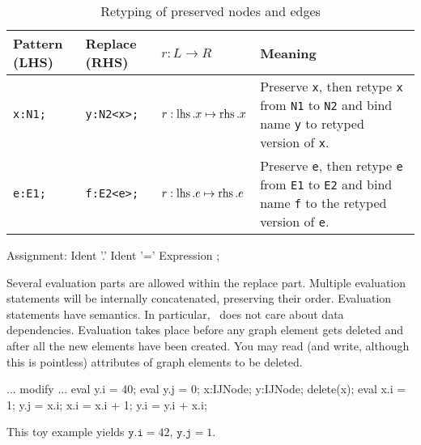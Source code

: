 \begin{table}[htbp]
\centering
\begin{tabularx}{\linewidth}{lllX}
  \textbf{Pattern (LHS)} & \textbf{Replace (RHS)} & \textbf{$r: L \longrightarrow R$} & \textbf{Meaning} \\ \hline 
  \texttt{x:N1;} & \texttt{y:N2<x>;}          & $r:\operatorname{lhs}.x \mapsto \operatorname{rhs}.x$ & Preserve \texttt{x}, then retype \texttt{x} from \texttt{N1} to \texttt{N2} and bind name \texttt{y} to retyped version of \texttt{x}.\\
  \texttt{e:E1;} & \texttt{f:E2<e>;}          & $r:\operatorname{lhs}.e \mapsto \operatorname{rhs}.e$ & Preserve \texttt{e}, then retype \texttt{e} from \texttt{E1} to \texttt{E2} and bind name \texttt{f} to the retyped version of \texttt{e}.\\
\end{tabularx}
\caption{Retyping of preserved nodes and edges}
\label{rule:retyping_graphlets}
\end{table}

\begin{rail}    
   Assignment: Ident '.' Ident '=' Expression ;
\end{rail}
Several evaluation parts are allowed within the replace part. Multiple evaluation statements will be internally concatenated, preserving their order. Evaluation statements have  semantics. In particular, \GrG\ does not care about data dependencies. Evaluation takes place before any graph element gets deleted and after all the new elements have been created. You may read (and write, although this is pointless) attributes of graph elements to be deleted.
\begin{example}
\begin{grgen}
...
modify {
  ...
  eval { y.i = 40; }
  eval { y.j = 0;  }
  x:IJNode;
  y:IJNode;
  delete(x);
  eval {
    x.i = 1; 
    y.j = x.i;
    x.i = x.i + 1;
    y.i = y.i + x.i;
  }
}
\end{grgen}
This toy example yields $\texttt{y.i} = 42$, $\texttt{y.j} = 1$.
\end{example}

